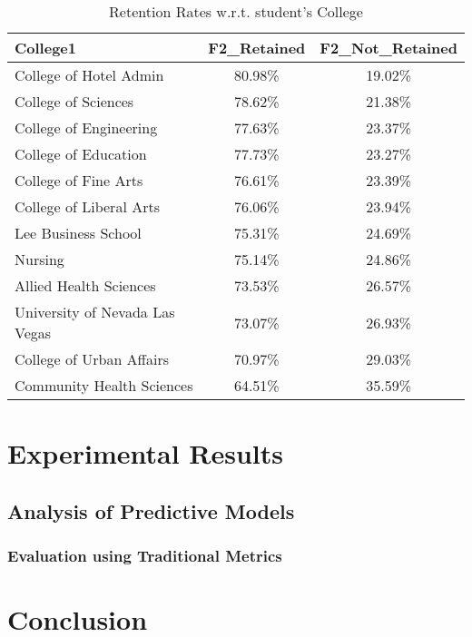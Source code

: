 \documentclass[11pt,openright]{report}
\begin{document}
\begin{table}[!t]
	\renewcommand{\arraystretch}{1.3}
	\caption{Retention Rates w.r.t. student's College}
	\label{table:college_retentions}
	\centering
	\begin{tabular}{|l|c|c|}
		\hline
		\bfseries College1 & \bfseries F2\_Retained & \bfseries F2\_Not\_Retained\\
		\hline
		College of Hotel Admin  & 80.98\%  & 19.02\% \\ \hline
		College of Sciences & 78.62\% &  21.38\% \\ \hline
		College of Engineering & 77.63\% & 23.37\% \\ \hline
		College of Education    &   77.73\% &  23.27\% \\ \hline
		College of Fine Arts &  76.61\%  & 23.39\% \\ \hline
		College of Liberal Arts & 76.06\% & 23.94\% \\ \hline
		Lee Business School  & 75.31\% &  24.69\% \\ \hline
		Nursing    &  75.14\%  & 24.86\% \\ \hline
		Allied Health Sciences  & 73.53\% &  26.57\% \\ \hline
		University of Nevada Las Vegas     & 73.07\% &  26.93\% \\ \hline
		College of Urban Affairs  &         70.97\% &  29.03\% \\ \hline
		Community Health Sciences         &    64.51\% & 35.59\% \\ \hline
	\end{tabular}
\end{table}


\chapter{Experimental Results} \label{chapter:experiment_results}
\section {Analysis of Predictive Models}
\subsection {Evaluation using Traditional Metrics}
\chapter{Conclusion} \label{chapter:conclusion}

\end{document}
